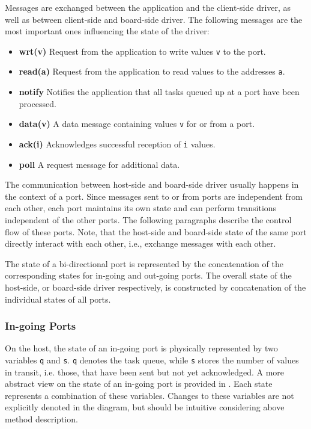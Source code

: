 \documentclass{report}
\begin{document}
Messages are exchanged between the application and the client-side driver, as well as between client-side and board-side driver. The following messages are the most important ones influencing the state of the driver:
\begin{itemize} \itemsep1pt \parskip0pt 
  \item \textbf{wrt(v)} Request from the application to write values \texttt{v} to the port.
  \item \textbf{read(a)} Request from the application to read values to the addresses \texttt{a}.
  \item \textbf{notify} Notifies the application that all tasks queued up at a port have been processed.
  \item \textbf{data(v)} A data message containing values \texttt{v} for or from a port.
  \item \textbf{ack(i)} Acknowledges successful reception of \texttt{i} values.
  \item \textbf{poll} A request message for additional data.
\end{itemize}

The communication between host-side and board-side driver usually happens in the context of a port. Since messages sent to or from ports are independent from each other, each port maintains its own state and can perform transitions independent of the other ports. The following paragraphs describe the control flow of these ports. Note, that the host-side and board-side state of the same port directly interact with each other, i.e., exchange messages with each other.

The state of a bi-directional port is represented by the concatenation of the corresponding states for in-going and out-going ports. The overall state of the host-side, or board-side driver respectively, is constructed by concatenation of the individual states of all ports.

\subsubsection{In-going Ports}
On the host, the state of an in-going port is physically represented by two variables \texttt{q} and \texttt{s}. \texttt{q} denotes the task queue, while \texttt{s} stores the number of values in transit, i.e. those, that have been sent but not yet acknowledged. A more abstract view on the state of an in-going port is provided in . Each state represents a combination of these variables. Changes to these variables are not explicitly denoted in the diagram, but should be intuitive considering above method description.
\end{document}
